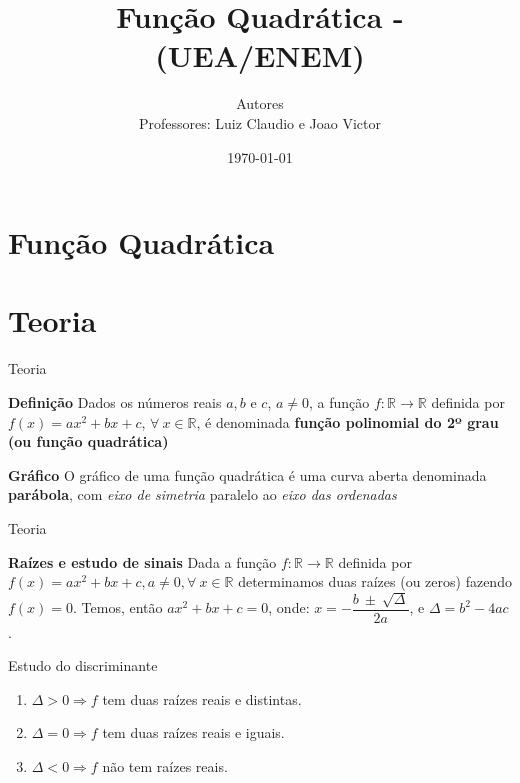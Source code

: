 \documentclass[11pt]{beamer}
\author[CETi / IFAM CMC]{Autores \\ Professores: Luiz Claudio e Joao Victor}
\title{Função Quadrática - (UEA/ENEM)}
\institute[]{CETi BILÍNGUE GILBERTO MESTRINHO \par INSTITUTO FEDERAL DO AMAZONAS }
\date{\today}
\begin{document}
\justifying
\onehalfspacing 

\begin{frame}
    \titlepage
\end{frame}

\section{Função Quadrática}

\section{Teoria}

\begin{frame}{Teoria}

    \begin{block}{\textbf{Definição}}
        Dados os números reais $a, b$ e $c$, $a \neq 0$, a função $f: \mathbb{R} \to \mathbb{R}$ definida por $f(x)=ax^{2}+bx+c$, $\forall \ x \in \mathbb{R}$, é denominada \textbf{função polinomial do 2º grau (ou função quadrática)}
    \end{block}

    \pause 
    
    \begin{block}{\textbf{Gráfico}}
        O gráfico de uma função quadrática é uma curva aberta denominada \textbf{parábola}, com \textit{eixo de simetria} paralelo ao \textit{eixo das ordenadas}
    \end{block}
    
\end{frame}

\begin{frame}{Teoria}

    \begin{block}{\textbf{Raízes e estudo de sinais}}
        Dada a função $f: \mathbb{R} \to \mathbb{R}$ definida por $f(x)=ax^{2}+bx+c, a \neq 0, \forall \ x \in \mathbb{R}$ determinamos duas raízes (ou zeros) fazendo $f(x)=0$. Temos, então $ax^{2}+bx+c=0$, onde: $x=-\dfrac{b\  \pm \ \sqrt{\Delta}}{2a}$, e $\Delta=b^{2}-4ac$.
    \end{block}

    \pause 
    
    \begin{block}{Estudo do discriminante}
        \begin{enumerate}[I]
            \item $\Delta > 0 \Rightarrow f$ tem duas raízes reais e distintas.
            \item $\Delta = 0 \Rightarrow f$ tem duas raízes reais e iguais.
            \item $\Delta < 0 \Rightarrow f$ não tem raízes reais.
        \end{enumerate}
        
    \end{block}
    
\end{frame}
\end{document}
